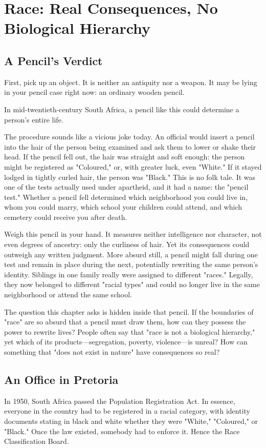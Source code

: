\chapter[Race and Its Real Consequences]{Race: Real Consequences, No Biological Hierarchy}
\section{A Pencil's Verdict}
First, pick up an object. It is neither an antiquity nor a weapon. It may be lying in your pencil case right now: an ordinary wooden pencil.

In mid-twentieth-century South Africa, a pencil like this could determine a person's entire life.

The procedure sounds like a vicious joke today. An official would insert a pencil into the hair of the person being examined and ask them to lower or shake their head. If the pencil fell out, the hair was straight and soft enough: the person might be registered as "Coloured," or, with greater luck, even "White." If it stayed lodged in tightly curled hair, the person was "Black." This is no folk tale. It was one of the tests actually used under apartheid, and it had a name: the "pencil test." Whether a pencil fell determined which neighborhood you could live in, whom you could marry, which school your children could attend, and which cemetery could receive you after death.

Weigh this pencil in your hand. It measures neither intelligence nor character, not even degrees of ancestry: only the curliness of hair. Yet its consequences could outweigh any written judgment. More absurd still, a pencil might fall during one test and remain in place during the next, potentially rewriting the same person's identity. Siblings in one family really were assigned to different "races." Legally, they now belonged to different "racial types" and could no longer live in the same neighborhood or attend the same school.

The question this chapter asks is hidden inside that pencil. If the boundaries of "race" are so absurd that a pencil must draw them, how can they possess the power to rewrite lives? People often say that "race is not a biological hierarchy," yet which of its products---segregation, poverty, violence---is unreal? How can something that "does not exist in nature" have consequences so real?

\section{An Office in Pretoria}
In 1950, South Africa passed the Population Registration Act. In essence, everyone in the country had to be registered in a racial category, with identity documents stating in black and white whether they were "White," "Coloured," or "Black." Once the law existed, somebody had to enforce it. Hence the Race Classification Board.

